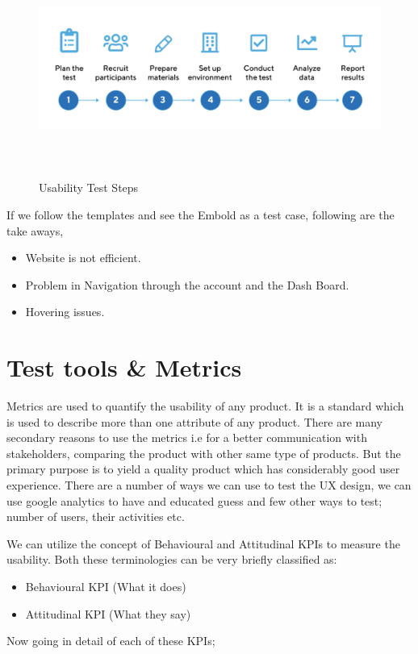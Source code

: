 \begin{figure}[htbp]
\begin{center}
\includegraphics[width=6.5in, height=2.8in]{usability-testing.png}
\caption{Usability Test Steps~\cite{sixsteps}}
\label{fig:usability}
\end{center}
\end{figure}
If we follow the templates and see the Embold as a test case, following are the take aways,

\begin{itemize}
\item Website is not efficient.
\item Problem in Navigation through the account and the Dash Board.
\item Hovering issues.
\end{itemize}

\section{Test tools \& Metrics}
Metrics are used to quantify the usability of any product. It is a standard which  is used to describe more than one attribute of any product. There are many secondary reasons to use the metrics i.e for a better communication with stakeholders, comparing the product with other same type of products. But the primary purpose is to yield a quality product which has considerably good user experience.
There are a number of ways we can use to test the UX design, we can use google analytics to have and educated guess and few other ways to test; number of users, their activities etc.  \par
We can utilize the concept of Behavioural and Attitudinal KPIs to measure the usability. Both these terminologies can be very briefly classified as: ~\cite{tools}
\begin{itemize}
\item Behavioural KPI (What it does)
\item Attitudinal KPI (What they say)
\end{itemize} 
Now going in detail of each of these KPIs;
